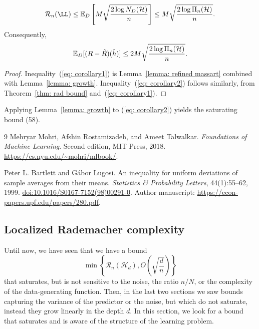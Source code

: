 \documentclass[reqno]{amsart}
\begin{document}
\begin{corollary}\label{cor:growth}
\cite[Section~3.2, Corollary~3.8]{MRT2018}
\begin{equation}\label{eq: corollary1}
 \mathcal R_n(\LL)\le\expv_D\left[M\sqrt{\frac{2\log N_D(\cH)}n}\right]
 \le M\sqrt{\frac{2\log\Pi_{n}(\cH)}n}.
\end{equation}
Consequently,
\begin{equation}\label{eq: corollary2}
 \mathbb{E}_D[(R-\hat R)(\hat h)]\le
 2M\sqrt{\frac{2\log\Pi_{n}(\mathcal{H})}n}.
\end{equation}

\begin{proof}
    Inequality~(\ref{eq: corollary1}) is Lemma~\ref{lemma: refined massart} combined with Lemma~\ref{lemma: growth}. Inequality~(\ref{eq: corollary2}) follows similarly, from Theorem~\ref{thm: rad bound} and~(\ref{eq: corollary1}).
\end{proof}
\end{corollary}

Applying Lemma~\ref{lemma: growth} to (\ref{eq: corollary2}) yields the saturating bound (58). 

\begin{thebibliography}{9}
Mehryar Mohri, Afshin Rostamizadeh, and Ameet Talwalkar.
\newblock \emph{Foundations of Machine Learning}.
\newblock Second edition, MIT Press, 2018.
\newblock \url{https://cs.nyu.edu/~mohri/mlbook/}.

Peter L. Bartlett and G\'abor Lugosi.
\newblock An inequality for uniform deviations of sample averages from their means.
\newblock \emph{Statistics \& Probability Letters}, 44(1):55--62, 1999.
\newblock \href{https://doi.org/10.1016/S0167-7152(98)00291-0}{doi:10.1016/S0167-7152(98)00291-0}.
\newblock Author manuscript: \url{https://econ-papers.upf.edu/papers/280.pdf}.
\end{thebibliography}

\newpage
\subsection{Localized Rademacher complexity}

Until now, we have seen that we have a bound \[\min \left\{\mathcal R_n(\mathcal H_d), O\left(\sqrt{\frac{d}{n}}\right)\right\}\] that saturates, but is not sensitive to the noise, the ratio $n/N$, or the complexity of the data-generating function. Then, in the last two sections we saw bounds capturing the variance of the predictor or the noise, but which do not saturate, instead they grow linearly in the depth $d$. In this section, we look for a bound that saturates and is aware of the structure of the learning problem.
\end{document}
